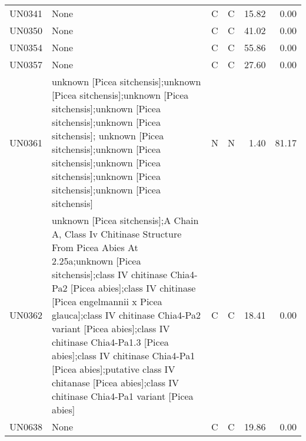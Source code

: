 \begin{longtable}{llllrr}
UN0341 &  None &  C &  C &  15.82 &  0.00 \\
UN0350 &  None &  C &  C &  41.02 &  0.00 \\
UN0354 &  None &  C &  C &  55.86 &  0.00 \\
UN0357 &  None &  C &  C &  27.60 &  0.00 \\
UN0361 &  unknown [Picea sitchensis];unknown [Picea sitchensis];unknown [Picea sitchensis];unknown [Picea sitchensis];unknown [Picea sitchensis]; unknown [Picea sitchensis];unknown [Picea sitchensis];unknown [Picea sitchensis];unknown [Picea sitchensis];unknown [Picea sitchensis] &  N &  N &  1.40 &  81.17 \\
UN0362 &  unknown [Picea sitchensis];A Chain A, Class Iv Chitinase Structure From Picea Abies At 2.25a;unknown [Picea sitchensis];class IV chitinase Chia4-Pa2 [Picea abies];class IV chitinase [Picea engelmannii x Picea glauca];class IV chitinase Chia4-Pa2 variant [Picea abies];class IV chitinase Chia4-Pa1.3 [Picea abies];class IV chitinase Chia4-Pa1 [Picea abies];putative class IV chitanase [Picea abies];class IV chitinase Chia4-Pa1 variant [Picea abies] &  C &  C &  18.41 &  0.00 \\
UN0638 &  None &  C &  C &  19.86 &  0.00 \\
\end{longtable}
